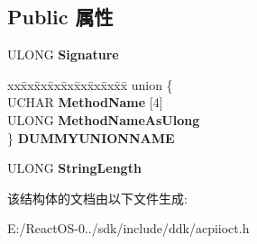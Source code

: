 \subsection*{Public 属性}
\begin{DoxyCompactItemize}
\item 
\mbox{\label{struct___a_c_p_i___e_v_a_l___i_n_p_u_t___b_u_f_f_e_r___s_i_m_p_l_e___s_t_r_i_n_g_a08b276c7f4687bae8f336c8bf8e6959b}} 
U\+L\+O\+NG {\bfseries Signature}
\item 
\mbox{\label{struct___a_c_p_i___e_v_a_l___i_n_p_u_t___b_u_f_f_e_r___s_i_m_p_l_e___s_t_r_i_n_g_a6981dbd21bb08d0a0224983470ea2a78}} 
\begin{tabbing}
xx\=xx\=xx\=xx\=xx\=xx\=xx\=xx\=xx\=\kill
union \{\\
\>UCHAR {\bfseries MethodName} \mbox{[}4\mbox{]}\\
\>ULONG {\bfseries MethodNameAsUlong}\\
\} {\bfseries DUMMYUNIONNAME}\\

\end{tabbing}\item 
\mbox{\label{struct___a_c_p_i___e_v_a_l___i_n_p_u_t___b_u_f_f_e_r___s_i_m_p_l_e___s_t_r_i_n_g_a8b0ca72e91f79e4aaaee7f78baa6ca8c}} 
U\+L\+O\+NG {\bfseries String\+Length}
\end{DoxyCompactItemize}


该结构体的文档由以下文件生成\+:\begin{DoxyCompactItemize}
\item 
E\+:/\+React\+O\+S-\/0../sdk/include/ddk/acpiioct.\+h\end{DoxyCompactItemize}
